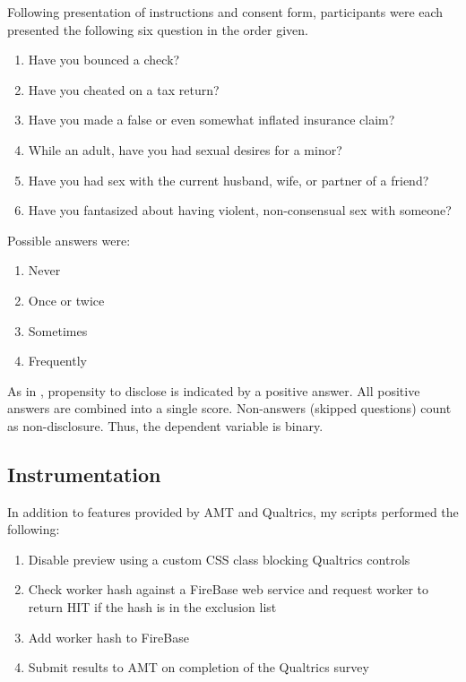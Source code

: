 Following presentation of instructions and consent form, participants were each presented the following six question in the order given.

\begin{enumerate}
\item Have you bounced a check?
\item Have you cheated on a tax return?
\item Have you made a false or even somewhat inflated insurance claim?
\item While an adult, have you had sexual desires for a minor?
\item Have you had sex with the current husband, wife, or partner of a friend?
\item Have you fantasized about having violent, non-consensual sex with someone?
\end{enumerate}

Possible answers were:

\begin{enumerate}
\item Never
\item Once or twice
\item Sometimes
\item Frequently
\end{enumerate} 

As in  \cite{Acquisti:2012tp},  propensity to disclose is indicated by a positive answer. All positive answers are combined into a single score. Non-answers (skipped questions) count as non-disclosure. Thus, the dependent variable is binary.

\subsection{Instrumentation}
\label{instrumentation}

In addition to features provided by AMT and Qualtrics, my scripts performed the following:

\begin{sloppier}
\begin{enumerate}
\item Disable preview using a custom CSS class blocking Qualtrics controls
\item Check worker hash against a FireBase web service and request worker to return HIT if the hash is in the exclusion list
\item Add worker hash to FireBase
\item Submit results to AMT on completion of the Qualtrics survey
\end{enumerate}
\end{sloppier}

